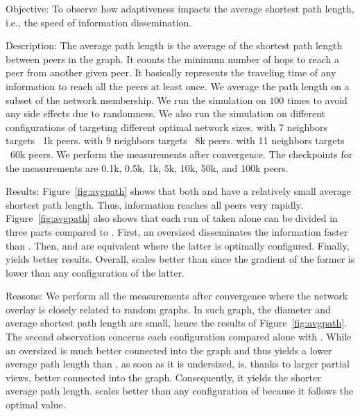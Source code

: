 \begin{asparadesc}
\item[Objective:] To observe how adaptiveness impacts the average shortest path
  length, i.e., the speed of information dissemination.
\item[Description:] The average path length is the average of the
  shortest path length between peers in the graph. It counts the
  minimum number of hops to reach a peer from another given peer. It
  basically represents the traveling time of any information to reach
  all the peers at least once. We average the path length on a subset
  of the network membership. We run the simulation on \SPRAY $100$
  times to avoid any side effects due to randomness. We also run the
  simulation on different configurations of \CYCLON targeting
  different optimal network sizes. \CYCLON with 7 neighbors targets ~1k
  peers. \CYCLON with 9 neighbors targets ~8k peers. \CYCLON with 11
  neighbors targets ~60k peers. We perform the measurements after
  convergence. The checkpoints for the measurements are 0.1k, 0.5k,
  1k, 5k, 10k, 50k, and 100k peers.
\item[Results:] Figure~\ref{fig:avgpath} shows that both \CYCLON and
  \SPRAY have a relatively small average shortest path length. Thus,
  information reaches all peers very rapidly. Figure~\ref{fig:avgpath}
  also shows that each run of \CYCLON taken alone can be divided in
  three parts compared to \SPRAY. First, an oversized \CYCLON
  disseminates the information faster than \SPRAY. Then, \SPRAY and
  \CYCLON are equivalent where the latter is optimally
  configured. Finally, \SPRAY yields better results. Overall, \SPRAY
  scales better than \CYCLON since the gradient of the former is lower
  than any configuration of the latter.
\item[Reasons:] We perform all the measurements after convergence where the
  network overlay is closely related to random graphs. In such graph, the
  diameter and average shortest path length are small, hence the results of
  Figure~\ref{fig:avgpath}. The second observation concerns each \CYCLON
  configuration compared alone with \SPRAY. While an oversized \CYCLON is much
  better connected into the graph and thus yields a lower average path length
  than \SPRAY, as soon as it is undersized, \SPRAY is, thanks to larger partial
  views, better connected into the graph.  Consequently, it yields the shorter
  average path length. \SPRAY scales better than any configuration of \CYCLON
  because it follows the optimal value.
\end{asparadesc}


